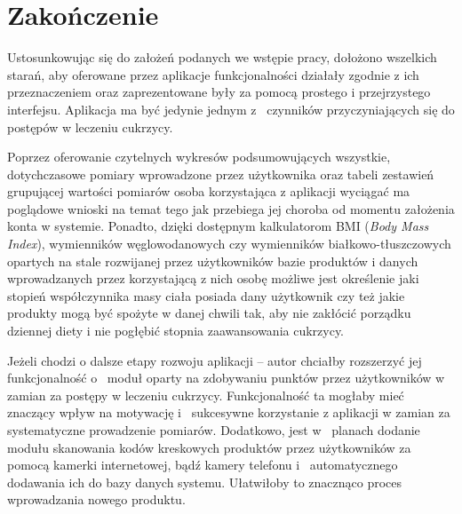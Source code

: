 \chapter{Zakończenie}

Ustosunkowując się do założeń podanych we wstępie pracy, dołożono wszelkich starań, aby oferowane przez aplikacje funkcjonalności działały zgodnie z ich przeznaczeniem oraz zaprezentowane były za pomocą prostego i przejrzystego interfejsu. Aplikacja ma być jedynie jednym z~ czynników przyczyniających się do postępów w leczeniu cukrzycy. 

Poprzez oferowanie czytelnych wykresów podsumowujących wszystkie, dotychczasowe pomiary wprowadzone przez użytkownika oraz tabeli zestawień grupującej wartości pomiarów osoba korzystająca z aplikacji wyciągać ma poglądowe wnioski na temat tego jak przebiega jej choroba od momentu założenia konta w systemie. Ponadto, dzięki dostępnym kalkulatorom BMI (\textit{Body Mass Index}), wymienników węglowodanowych czy wymienników białkowo-tłuszczowych opartych na stale rozwijanej przez użytkowników bazie produktów i danych wprowadzanych przez korzystającą z nich osobę możliwe jest określenie jaki stopień współczynnika masy ciała posiada dany użytkownik czy też jakie produkty mogą być spożyte w danej chwili tak, aby nie zakłócić porządku dziennej diety i nie pogłębić stopnia zaawansowania cukrzycy. 

Jeżeli chodzi o dalsze etapy rozwoju aplikacji -- autor chciałby rozszerzyć jej funkcjonalność o~ moduł oparty na zdobywaniu punktów przez użytkowników w zamian za postępy w leczeniu cukrzycy. Funkcjonalność ta mogłaby mieć znaczący wpływ na motywację i~ sukcesywne korzystanie z aplikacji w zamian za systematyczne prowadzenie pomiarów. Dodatkowo, jest w~ planach dodanie modułu skanowania kodów kreskowych produktów przez użytkowników za pomocą kamerki internetowej, bądź kamery telefonu i~ automatycznego dodawania ich do bazy danych systemu. Ułatwiłoby to znacznąco proces wprowadzania nowego produktu.
